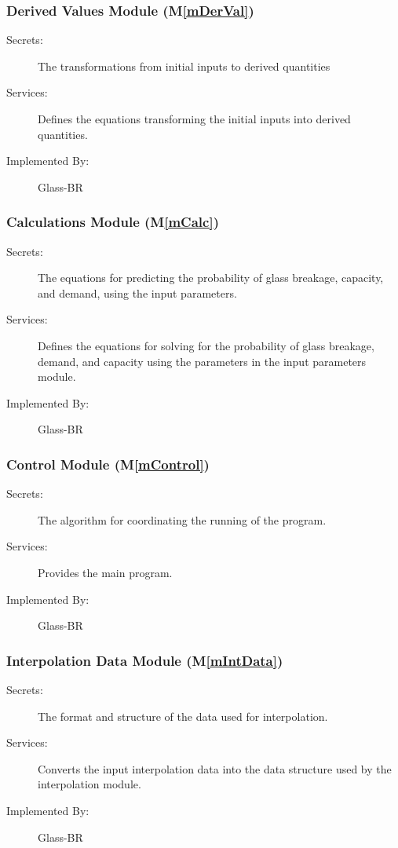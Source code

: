 \documentclass[12pt]{article}
\newcommand{\mref}[1]{M\ref{#1}}
\begin{document}
\subsubsection{Derived Values Module (\mref{mDerVal})}

\begin{description}
\item[Secrets:] The transformations from initial inputs to derived quantities
\item[Services:] Defines the equations transforming the initial inputs into 
derived quantities.
\item[Implemented By:] Glass-BR
\end{description} 

\subsubsection{Calculations Module (\mref{mCalc})}

\begin{description}
\item[Secrets:] The equations for predicting the probability of glass 
breakage, capacity, and demand, using the input parameters.
\item[Services:] Defines the equations for solving for the probability of glass 
breakage, demand, and capacity using the parameters in the input parameters 
module.
\item[Implemented By:] Glass-BR
\end{description} 
 
\subsubsection{Control Module (\mref{mControl})}

\begin{description}
\item[Secrets:] The algorithm for coordinating the running of the program.
\item[Services:] Provides the main program.
\item[Implemented By:] Glass-BR
\end{description}

\subsubsection{Interpolation Data Module (\mref{mIntData})}

\begin{description}
\item[Secrets:] The format and structure of the data used for interpolation.
\item[Services:] Converts the input interpolation data into the data structure 
used by the interpolation module.
\item[Implemented By:] Glass-BR
\end{description}
\end{document}
